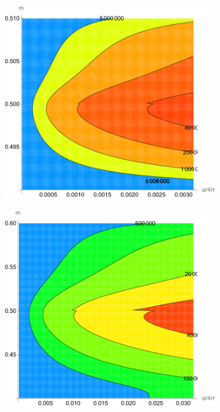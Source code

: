 \documentclass[10pt]{article}
\theoremstyle{definition}
\theoremstyle{remark}
\begin{document}
	\begin{figure}[h]
		\centering
		\begin{subfigure}{0.3\textwidth}
			\centering
			\includegraphics[width=\textwidth]{unbinned_0.01GeV.pdf}
			\caption{}
		\end{subfigure}
		\begin{subfigure}{0.3\textwidth}
			\centering
			\includegraphics[width=\textwidth]{unbinned_0.1GeV.pdf}

\end{subfigure}
\end{figure}
\end{document}

